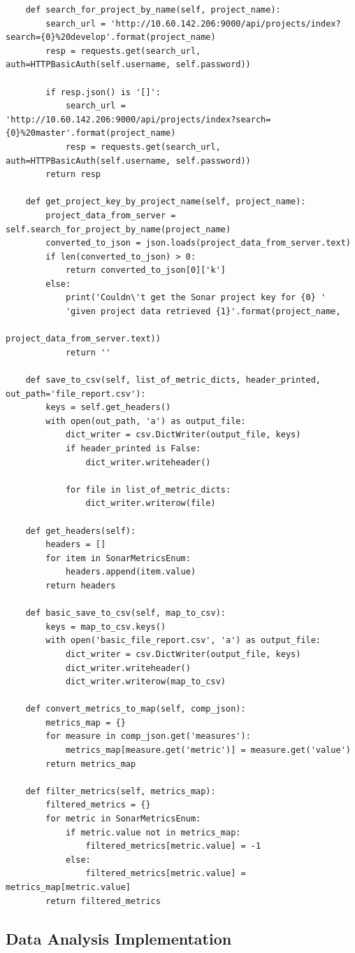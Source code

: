 \begin{landscape}
\begin{code}
\begin{verbatim}
    def search_for_project_by_name(self, project_name):
        search_url = 'http://10.60.142.206:9000/api/projects/index?search={0}%20develop'.format(project_name)
        resp = requests.get(search_url, auth=HTTPBasicAuth(self.username, self.password))

        if resp.json() is '[]':
            search_url = 'http://10.60.142.206:9000/api/projects/index?search={0}%20master'.format(project_name)
            resp = requests.get(search_url, auth=HTTPBasicAuth(self.username, self.password))
        return resp

    def get_project_key_by_project_name(self, project_name):
        project_data_from_server = self.search_for_project_by_name(project_name)
        converted_to_json = json.loads(project_data_from_server.text)
        if len(converted_to_json) > 0:
            return converted_to_json[0]['k']
        else:
            print('Couldn\'t get the Sonar project key for {0} '
            'given project data retrieved {1}'.format(project_name,
                                                                                                        project_data_from_server.text))
            return ''

    def save_to_csv(self, list_of_metric_dicts, header_printed, out_path='file_report.csv'):
        keys = self.get_headers()
        with open(out_path, 'a') as output_file:
            dict_writer = csv.DictWriter(output_file, keys)
            if header_printed is False:
                dict_writer.writeheader()

            for file in list_of_metric_dicts:
                dict_writer.writerow(file)

    def get_headers(self):
        headers = []
        for item in SonarMetricsEnum:
            headers.append(item.value)
        return headers

    def basic_save_to_csv(self, map_to_csv):
        keys = map_to_csv.keys()
        with open('basic_file_report.csv', 'a') as output_file:
            dict_writer = csv.DictWriter(output_file, keys)
            dict_writer.writeheader()
            dict_writer.writerow(map_to_csv)

    def convert_metrics_to_map(self, comp_json):
        metrics_map = {}
        for measure in comp_json.get('measures'):
            metrics_map[measure.get('metric')] = measure.get('value')
        return metrics_map

    def filter_metrics(self, metrics_map):
        filtered_metrics = {}
        for metric in SonarMetricsEnum:
            if metric.value not in metrics_map:
                filtered_metrics[metric.value] = -1
            else:
                filtered_metrics[metric.value] = metrics_map[metric.value]
        return filtered_metrics
 \end{verbatim}
 \end{code}

\end{landscape}


 

\subsection{Data Analysis Implementation}\label{sec:impl-data-analysis}